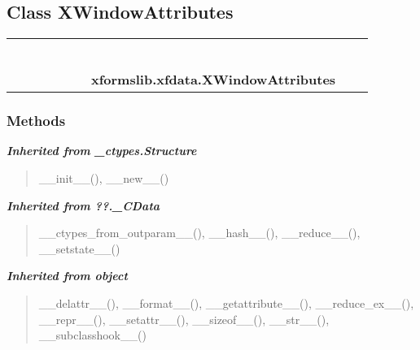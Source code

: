 \subsection{Class XWindowAttributes}

    \label{xformslib:xfdata:XWindowAttributes}
\begin{tabular}{cccccccccc}
\multicolumn{2}{r}{\settowidth{\BCL}{object}\multirow{2}{\BCL}{object}}
&&
&&
&&
  \\\cline{3-3}
  &&\multicolumn{1}{c|}{}
&&
&&
&&
  \\
\multicolumn{4}{r}{\settowidth{\BCL}{??.\_CData}\multirow{2}{\BCL}{??.\_CData}}
&&
&&
  \\\cline{5-5}
  &&&&\multicolumn{1}{c|}{}
&&
&&
  \\
\multicolumn{6}{r}{\settowidth{\BCL}{\_ctypes.Structure}\multirow{2}{\BCL}{\_ctypes.Structure}}
&&
  \\\cline{7-7}
  &&&&&&\multicolumn{1}{c|}{}
&&
  \\
&&&&&&\multicolumn{2}{l}{\textbf{xformslib.xfdata.XWindowAttributes}}
\end{tabular}



  \subsubsection{Methods}


\large{\textbf{\textit{Inherited from \_ctypes.Structure}}}

\begin{quote}
\_\_init\_\_(), \_\_new\_\_()
\end{quote}

\large{\textbf{\textit{Inherited from ??.\_CData}}}

\begin{quote}
\_\_ctypes\_from\_outparam\_\_(), \_\_hash\_\_(), \_\_reduce\_\_(), \_\_setstate\_\_()
\end{quote}

\large{\textbf{\textit{Inherited from object}}}

\begin{quote}
\_\_delattr\_\_(), \_\_format\_\_(), \_\_getattribute\_\_(), \_\_reduce\_ex\_\_(), \_\_repr\_\_(), \_\_setattr\_\_(), \_\_sizeof\_\_(), \_\_str\_\_(), \_\_subclasshook\_\_()
\end{quote}


